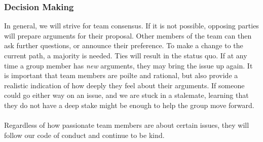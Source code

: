 \documentclass{article}
\begin{document}
\subsubsection*{Decision Making} 

In general, we will strive for team consensus. If it is not possible, opposing parties will prepare arguments for their proposal.
Other members of the team can then ask further questions, or announce their preference. To make a change to the current path, a majority is needed. Ties will
result in the status quo. If at any time a group member has \textit{new} arguments, they may bring the issue up again. It is important that team members are
poilte and rational, but also provide a realistic indication of how deeply they feel about their arguments. If someone could go either way on an issue, and 
we are stuck in a stalemate, learning that they do not have a deep stake might be enough to help the group move forward.\\\\
Regardless of how passionate team members are about certain issues, they will follow our code of conduct and continue to be kind.

\end{document}
